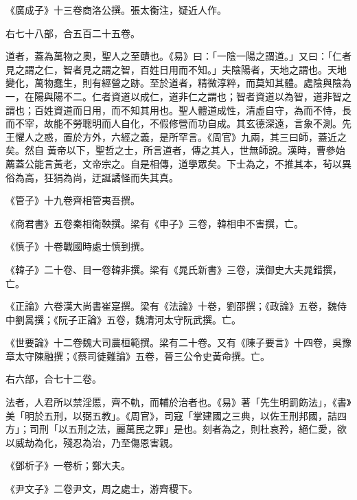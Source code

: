 \begin{pinyinscope}
 《廣成子》十三卷商洛公撰。張太衡注，疑近人作。



 右七十八部，合五百二十五卷。



 道者，蓋為萬物之奧，聖人之至賾也。《易》曰：「一陰一陽之謂道。」又曰：「仁者見之謂之仁，智者見之謂之智，百姓日用而不知。」夫陰陽者，天地之謂也。天地變化，萬物蠢生，則有經營之跡。至於道者，精微淳粹，而莫知其體。處陰與陰為一，在陽與陽不二。仁者資道以成仁，道非仁之謂也；智者資道以為智，道非智之謂也；百姓資道而日用，而不知其用也。聖人體道成性，清虛自守，為而不恃，長而不宰，故能不勞聰明而人自化，不假修營而功自成。其玄德深遠，言象不測。先王懼人之惑，置於方外，六經之義，是所罕言。《周官》九兩，其三曰師，蓋近之矣。然自
 黃帝以下，聖哲之士，所言道者，傳之其人，世無師說。漢時，曹參始薦蓋公能言黃老，文帝宗之。自是相傳，道學眾矣。下士為之，不推其本，茍以異俗為高，狂狷為尚，迂誕譎怪而失其真。



 《管子》十九卷齊相管夷吾撰。



 《商君書》五卷秦相衛鞅撰。梁有《申子》三卷，韓相申不害撰，亡。



 《慎子》十卷戰國時處士慎到撰。



 《韓子》二十卷、目一卷韓非撰。梁有《晁氏新書》三卷，漢御史大夫晁錯撰，亡。



 《正論》六卷漢大尚書崔寔撰。梁有《法論》十卷，劉邵撰；《政論》五卷，魏侍中劉暠撰；《阮子正論》五卷，魏清河太守阮武撰。亡。



 《世要論》十二卷魏大司農桓範撰。梁有二十卷。又有《陳子要言》十四卷，吳豫章太守陳融撰；《蔡司徒難論》五卷，晉三公令史黃命撰。亡。



 右六部，合七十二卷。



 法者，人君所以禁淫慝，齊不軌，而輔於治者也。《易》著「先生明罰飭法」，《書》美「明於五刑，以弼五教」。《周官》，司寇「掌建國之三典，以佐王刑邦國，詰四方」；司刑「以五刑之法，麗萬民之罪」是也。刻者為之，則杜哀矜，絕仁愛，欲以威劫為化，殘忍為治，乃至傷恩害親。



 《鄧析子》一卷析；鄭大夫。



 《尹文子》二卷尹文，周之處士，游齊稷下。




\end{pinyinscope}
